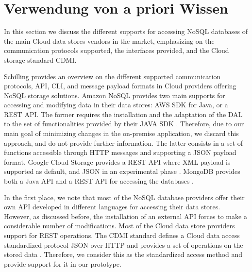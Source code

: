 \section{Verwendung von a priori Wissen }
\label{sec:VerwendungvonaprioriWissen }


In this section we discuss the different supports for accessing \ac{NoSQL} databases of the main Cloud data stores vendors in the market, emphasizing on the communication protocols supported, the interfaces provided, and the Cloud storage standard CDMI.

Schilling provides an overview on the different supported communication protocols, \ac{API}, \ac{CLI}, and message payload formats in Cloud providers offering \ac{NoSQL} storage solutions. Amazon \ac{NoSQL} provides two main supports for accessing and modifying data in their data stores: AWS SDK for Java, or a REST \ac{API}. The former requires the installation and the adaptation of the DAL to the set of functionalities provided by their JAVA SDK \cite{amazondynamodb}. Therefore, due to our main goal of minimizing changes in the on-premise application, we discard this approach, and do not provide further information. The latter consists in a set of functions accessible through \ac{HTTP} messages and supporting a \ac{JSON} payload format. Google Cloud Storage provides a REST \ac{API} where \ac{XML} payload is supported as default, and \ac{JSON} in an experimental phase \cite{googlecloudstorage}. MongoDB provides both a Java API and a REST API for accessing the databases \cite{mongodb}.

In the first place, we note that most of the \ac{NoSQL} database providers offer their own API developed in different languages for accessing their data stores. However, as discussed before, the installation of an external API forces to make a considerable number of modifications. Most of the Cloud data store providers support for REST operations. The CDMI standard defines a Cloud data access standardized protocol \ac{JSON} over \ac{HTTP} and provides a set of operations on the stored data \cite{cdmispec2012}. Therefore, we consider this as the standardized access method and provide support for it in our prototype. 

